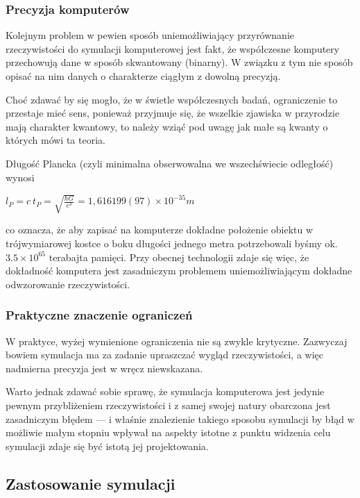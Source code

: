 \subsubsection{Precyzja komputerów}
\par{
Kolejnym problem w pewien sposób uniemożliwiający przyrównanie rzeczywistości do symulacji komputerowej jest fakt, że współczesne komputery przechowują dane w sposób skwantowany (binarny). W związku z tym nie sposób opisać na nim danych o charakterze ciągłym z dowolną precyzją.
}
\par{
Choć zdawać by się mogło, że w świetle współczesnych badań, ograniczenie to przestaje mieć sens, ponieważ przyjmuje się, że wszelkie zjawiska w przyrodzie mają charakter kwantowy, to należy wziąć pod uwagę jak małe są kwanty o których mówi ta teoria.
}
\par{
Długość Plancka (czyli minimalna obserwowalna we wszechświecie odległość) wynosi 
\begin{center}
$l_P = c \ t_P = \sqrt{\frac{\hbar G}{c^3}} = 1,616 199(97) \times 10^{-35} m$
\end{center}
co oznacza, że aby zapisać na komputerze dokładne położenie obiektu w trójwymiarowej kostce o boku długości jednego metra potrzebowali byśmy ok. $3.5 \times 10^{65}$ terabajta pamięci. Przy obecnej technologii zdaje się więc, że dokładność komputera jest zasadniczym problemem uniemożliwiającym dokładne odwzorowanie rzeczywistości.
}

\subsubsection{Praktyczne znaczenie ograniczeń}
\par{
W praktyce, wyżej wymienione ograniczenia nie są zwykle krytyczne. Zazwyczaj bowiem symulacja ma za zadanie upraszczać wygląd rzeczywistości, a więc nadmierna precyzja jest w wręcz niewskazana.
}
\par{
Warto jednak zdawać sobie sprawę, że symulacja komputerowa jest jedynie pewnym przybliżeniem rzeczywistości i z samej swojej natury obarczona jest zasadniczym błędem --- i właśnie znalezienie takiego sposobu symulacji by błąd w możliwie małym stopniu wpływał na aspekty istotne z punktu widzenia celu symulacji zdaje się być istotą jej projektowania.
}

\subsection{Zastosowanie symulacji}

